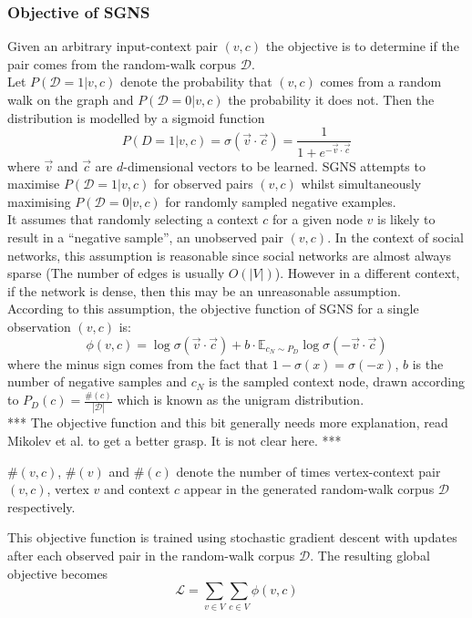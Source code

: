 \documentclass[a4paper]{article}
\renewcommand{\E}{\mathbb E}
\newcommand{\D}{\mathcal D}
\begin{document}
\subsubsection{Objective of SGNS}
Given an arbitrary input-context pair $(v,c)$ the objective is to determine if
the pair comes from the random-walk corpus $\mathcal{D}$.\\
Let $P(\D = 1 | v, c)$ denote the probability that $(v,c)$ comes from a random
walk on the graph and $P(\D = 0| v, c)$
the probability it does not. Then the distribution is modelled by a sigmoid
function
\[P(D = 1 | v, c) = \sigma(\vec{v} \cdot \vec{c}) = \frac{1}{1 + e^{-\vec{v} \cdot \vec{c}}}\]
where $\vec{v}$ and $\vec{c}$ are $d$-dimensional vectors to be learned. SGNS attempts to maximise $P(\mathcal{D} = 1 | v,c)$ for observed pairs $(v, c)$
whilst simultaneously maximising $P(\D = 0 | v, c)$ for randomly sampled
negative examples.\\
It assumes that randomly selecting a context $c$ for a given
node $v$ is likely to result in a ``negative sample'', an unobserved pair $(v,c)$. In the context of
social networks, this assumption is reasonable since social networks are almost
always sparse (The number of edges is usually $O(|V|)$). However in a different
context, if the network is dense, then this may be an unreasonable assumption.\\
According to this assumption, the objective function of SGNS for a single
observation $(v,c)$ is:
\[\phi(v, c) = \log{\sigma(\vec{v} \cdot \vec{c})} + b \cdot \E_{c_{N} \sim P_D}\log{\sigma(-\vec{v} \cdot \vec{c})}\]
where the minus sign comes from the fact that $1 - \sigma(x) = \sigma(-x)$, $b$
is the number of negative samples and $c_N$ is the sampled context node, drawn
according to $P_D (c) = \frac{\#(c)}{| \D |}$ which is known as the unigram
distribution.\\

*** The objective function and this bit generally needs more explanation, read
Mikolev et al. to get a better grasp. It is not clear here. ***
\begin{notation} $\#(v,c)$, $\#(v)$ and $\#(c)$ denote the number of times vertex-context pair
  $(v,c)$, vertex $v$ and context $c$ appear in the generated random-walk corpus
  $\mathcal{D}$ respectively.
\end{notation}
This objective function is trained using stochastic gradient descent with
updates after each  observed pair in the random-walk corpus $\D$. The resulting
global objective becomes
\begin{equation}
  \mathcal{L} = \sum_{v \in V} \sum_{c \in V} \phi(v, c)
\end{equation}
\end{document}
